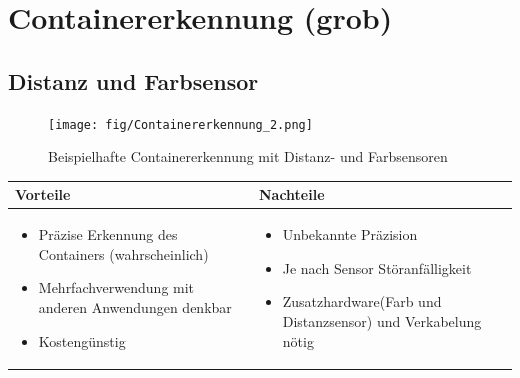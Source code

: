 
\section{Containererkennung (grob)}


\subsection{Distanz und Farbsensor}

\begin{figure} [hbp]
	\centering
	\texttt{[image: fig/Containererkennung\_2.png]}
	\caption{Beispielhafte Containererkennung mit Distanz- und Farbsensoren}
\end{figure}

\begin{table}[h]
\begin{tabular}{p{} | p{}}


 \textbf{Vorteile} & \textbf{Nachteile} \\ \hline
	 
\begin{itemize}
\item Präzise Erkennung des Containers (wahrscheinlich)
\item Mehrfachverwendung mit anderen Anwendungen denkbar
\item Kostengünstig
\end{itemize}

 
 &
 
\begin{itemize}
\item Unbekannte Präzision
\item Je nach Sensor Störanfälligkeit
\item Zusatzhardware(Farb und Distanzsensor) und Verkabelung nötig
\end{itemize}

\end{tabular}
\end{table}

